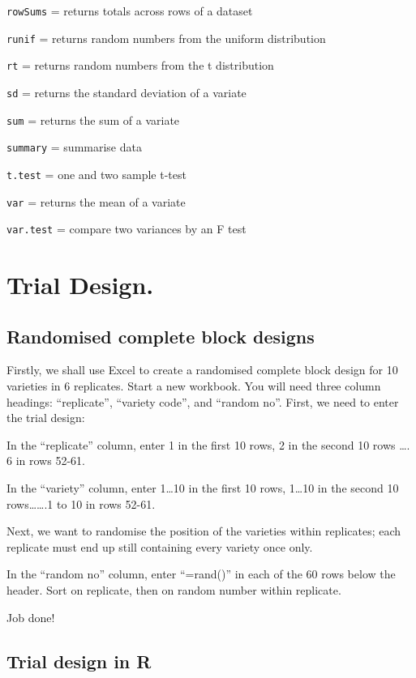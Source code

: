 \documentclass[
]{book}
\begin{document}
\texttt{rowSums} = returns totals across rows of a dataset

\texttt{runif} = returns random numbers from the uniform distribution

\texttt{rt} = returns random numbers from the t distribution

\texttt{sd} = returns the standard deviation of a variate

\texttt{sum} = returns the sum of a variate

\texttt{summary} = summarise data

\texttt{t.test} = one and two sample t-test

\texttt{var} = returns the mean of a variate

\texttt{var.test} = compare two variances by an F test

\hypertarget{Trial-design}{%
\chapter{Trial Design.}\label{Trial-design}}

\hypertarget{randomised-complete-block-designs}{%
\section{Randomised complete block designs}\label{randomised-complete-block-designs}}

Firstly, we shall use Excel to create a randomised complete block design for 10 varieties in 6 replicates. Start a new workbook. You will need three column headings: ``replicate'', ``variety code'', and ``random no''. First, we need to enter the trial design:

In the ``replicate'' column, enter 1 in the first 10 rows, 2 in the second 10 rows \ldots. 6 in rows 52-61.

In the ``variety'' column, enter 1\ldots10 in the first 10 rows, 1\ldots10 in the second 10 rows\ldots\ldots.1 to 10 in rows 52-61.

Next, we want to randomise the position of the varieties within replicates; each replicate must end up still containing every variety once only.

In the ``random no'' column, enter ``=rand()'' in each of the 60 rows below the header. Sort on replicate, then on random number within replicate.

Job done!

\hypertarget{trial-design-in-r}{%
\section{Trial design in R}\label{trial-design-in-r}}
\end{document}
